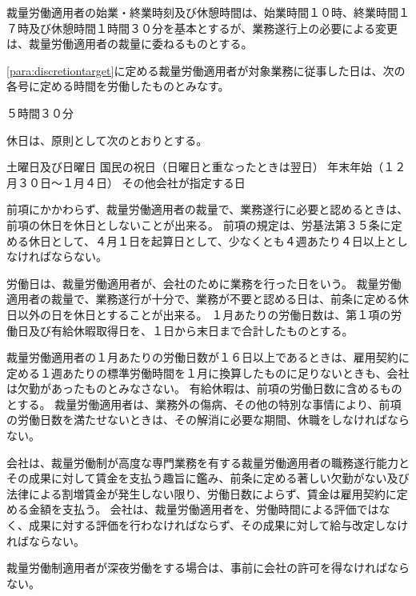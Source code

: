 \documentclass[10pt,a4paper,uplatex]{jsarticle}
\begin{document}
裁量労働適用者の始業・終業時刻及び休憩時間は、始業時間１０時、終業時間１７時及び休憩時間１時間３０分を基本とするが、業務遂行上の必要による変更は、裁量労働適用者の裁量に委ねるものとする。

\label{para:discretiontargetworktime}
\ref{para:discretiontarget}に定める裁量労働適用者が対象業務に従事した日は、次の各号に定める時間を労働したものとみなす。
\begin{enumerate}
    \itm ５時間３０分
\end{enumerate}

休日は、原則として次のとおりとする。
\begin{enumerate}
    \itm 土曜日及び日曜日
    \itm 国民の祝日（日曜日と重なったときは翌日）
    \itm 年末年始（１２月３０日〜１月４日）
    \itm その他会社が指定する日
\end{enumerate}
\term 前項にかかわらず、裁量労働適用者の裁量で、業務遂行に必要と認めるときは、前項の休日を休日としないことが出来る。
\term 前項の規定は、労基法第３５条に定める休日として、４月１日を起算日として、少なくとも４週あたり４日以上としなければならない。

労働日は、裁量労働適用者が、会社のために業務を行った日をいう。
\term 裁量労働適用者の裁量で、業務遂行が十分で、業務が不要と認める日は、前条に定める休日以外の日を休日とすることが出来る。
\term １月あたりの労働日数は、第１項の労働日及び有給休暇取得日を、１日から末日まで合計したものとする。

裁量労働適用者の１月あたりの労働日数が１６日以上であるときは、雇用契約に定める１週あたりの標準労働時間を１月に換算したものに足りないときも、会社は欠勤があったものとみなさない。
\term 有給休暇は、前項の労働日数に含めるものとする。
\term 裁量労働適用者は、業務外の傷病、その他の特別な事情により、前項の労働日数を満たせないときは、その解消に必要な期間、休職をしなければならない。

会社は、裁量労働制が高度な専門業務を有する裁量労働適用者の職務遂行能力とその成果に対して賃金を支払う趣旨に鑑み、前条に定める著しい欠勤がない及び法律による割増賃金が発生しない限り、労働日数によらず、賃金は雇用契約に定める金額を支払う。
\term 会社は、裁量労働適用者を、労働時間による評価ではなく、成果に対する評価を行わなければならず、その成果に対して給与改定しなければならない。

裁量労働制適用者が深夜労働をする場合は、事前に会社の許可を得なければならない。
\end{document}
